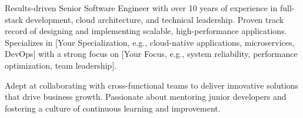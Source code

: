 
\begin{cvparagraph}
Results-driven Senior Software Engineer with over 10 years of experience in full-stack development, cloud architecture, and technical leadership. Proven track record of designing and implementing scalable, high-performance applications. Specializes in [Your Specialization, e.g., cloud-native applications, microservices, DevOps] with a strong focus on [Your Focus, e.g., system reliability, performance optimization, team leadership].

Adept at collaborating with cross-functional teams to deliver innovative solutions that drive business growth. Passionate about mentoring junior developers and fostering a culture of continuous learning and improvement.
\end{cvparagraph}
